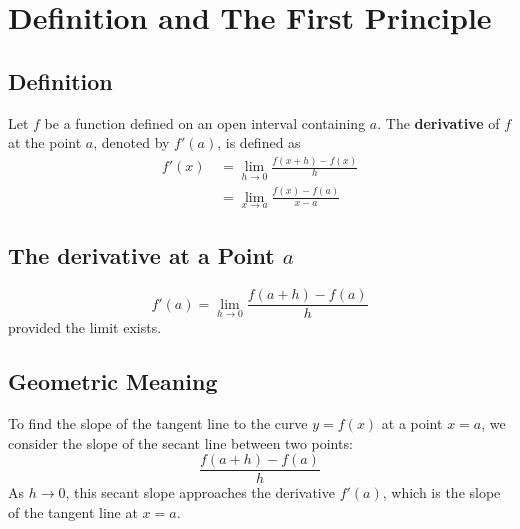 \documentclass[11pt]{article}
\begin{document}
\pagestyle{plain}
\begin{center}
  \tableofcontents
\end{center}
\newpage
\setcounter{page}{1}
\pagestyle{fancy}

\section{Definition and The First Principle}
\subsection{Definition}
Let $f$ be a function defined on an open interval containing $a$.  
The \textbf{derivative} of $f$ at the point $a$, denoted by $f'(a)$, is defined as
\begin{align*}
    f'(x)\,&=\lim_{h \to 0} \frac{f(x + h)-f(x)}{h}\\
        &=\lim_{x \to a}\frac{f(x)-f(a)}{x-a}
\end{align*}
\subsection{The derivative at a Point $a$}
\[
    f'(a)=\lim_{h\to 0}\frac{f(a+h)-f(a)}{h}
\]
provided the limit exists.
\subsection{Geometric Meaning}
To find the slope of the tangent line to the curve $y = f(x)$ at a point $x = a$, we consider the slope of the secant line between two points:
\[
    \frac{f(a+h) - f(a)}{h}
\]
As $h \to 0$, this secant slope approaches the derivative $f'(a)$, which is the slope of the tangent line at $x = a$.
\begin{center}
\end{center}
\end{document}
